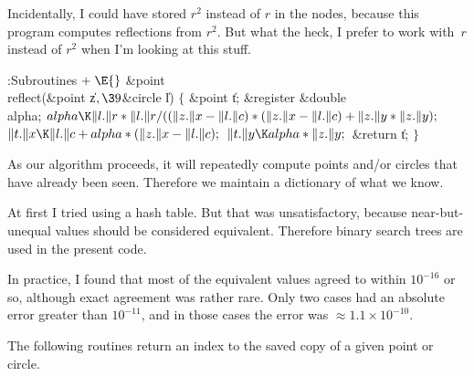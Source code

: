 Incidentally, I could have stored $r^2$ instead of $r$ in the
 nodes, because this program computes reflections from
$r^2$. But what the heck, I prefer to work with~$r$ instead of
$r^2$ when I'm looking at this stuff.

\Y\B\4:Subroutines\X${}\mathrel+\E{}$\6
\&{point} \\{reflect}(\&{point} \|z${},\39{}$\&{circle} \|l)\1\1\2\2\6
${}\{{}$\1\6
\&{point} \|t;\6
\&{register} \&{double} \\{alpha};\7
${}\\{alpha}\K\|l.\|r*\|l.\|r/((\|z.\|x-\|l.\|c)*(\|z.\|x-\|l.\|c)+\|z.\|y*\|z.%
\|y);{}$\6
${}\|t.\|x\K\|l.\|c+\\{alpha}*(\|z.\|x-\|l.\|c);{}$\6
${}\|t.\|y\K\\{alpha}*\|z.\|y;{}$\6
\&{return} \|t;\6
\4${}\}{}$\2\par
\fi

As our algorithm proceeds, it will repeatedly compute
points
and/or circles that have already been seen. Therefore we maintain
a dictionary of what we know.

At first I tried using a hash table. But that was unsatisfactory,
because near-but-unequal values should be considered equivalent.
Therefore binary search trees are used in the present code.

In practice, I found that most of the equivalent values agreed to
within $10^{-16}$ or so, although exact agreement was rather rare.
Only two cases had an absolute error greater than $10^{-11}$, and
in those cases the error was $\approx 1.1\times10^{-10}$.

The following routines return an index to the saved copy of
a given point or circle.

